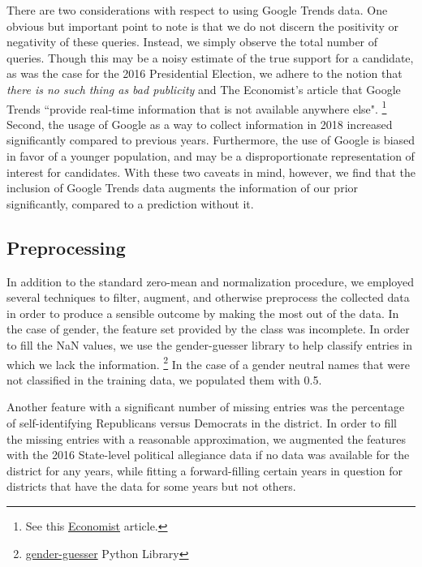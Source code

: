 \documentclass[11pt]{article}
\begin{document}
There are two considerations with respect to using Google Trends data. One
obvious but important point to note is that we do not discern the positivity or
negativity of these queries. Instead, we simply observe the total number of
queries. Though this may be a noisy estimate of the true support for a
candidate, as was the case for the 2016 Presidential Election, we adhere to the
notion that \textit{there is no such thing as bad publicity} and The Economist's
article that Google Trends ``provide real-time information that is not available
anywhere else". \footnote{See this
\href{https://www.economist.com/graphic-detail/2016/03/01/how-useful-is-google-search-data-when-predicting-primary-elections}{Economist} article.} Second, the usage of Google as a way to collect information in 2018 increased significantly compared to previous years. Furthermore, the use of Google is biased in favor of a younger population, and may be a disproportionate representation of interest for candidates. With these two caveats in mind, however, we find that the inclusion of Google Trends data augments the information of our prior significantly, compared to a prediction without it.

\subsection{Preprocessing}

In addition to the standard zero-mean and normalization procedure, we employed several techniques to filter, augment, and otherwise preprocess the collected data in order to produce a sensible outcome by making the most out of the data. In the case of gender, the feature set provided by the class was incomplete. In order to fill the NaN values, we use the gender-guesser library to help classify entries in which we lack the information. \footnote{\href{https://pypi.org/project/gender-guesser/}{gender-guesser} Python Library} In the case of a gender neutral names that were not classified in the training data, we populated them with 0.5.

Another feature with a significant number of missing entries was the percentage of self-identifying Republicans versus Democrats in the district. In order to fill the missing entries with a reasonable approximation, we augmented the features with the 2016 State-level political allegiance data if no data was available for the district for any years, while fitting a forward-filling certain years in question for districts that have the data for some years but not others.
\end{document}
